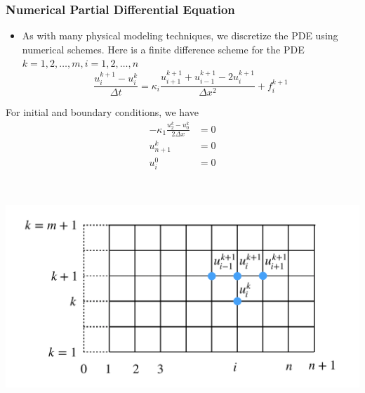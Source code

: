 \documentclass{beamer}
\begin{document}
\begin{frame}
	\frametitle{Numerical Partial Differential Equation}
	
	\begin{itemize}
		\item As with many physical modeling techniques, we discretize the PDE using numerical schemes. Here is a finite difference scheme for the PDE $k=1,2,\ldots,m, i=1,2,\ldots, n$
		$$\frac{u^{k+1}_i-u^k_i}{\Delta t} = \kappa_i \frac{u^{k+1}_{i+1}+u^{k+1}_{i-1}-2u^{k+1}_i}{\Delta x^2} + f_i^{k+1}$$
	\end{itemize}
	\begin{minipage}[c]{0.49\textwidth}
	For initial and boundary conditions, we have
		\begin{align*}
			-\kappa_1 \frac{u_2^{k}-u_0^k}{2\Delta x} &= 0\\
			u_{n+1}^k &= 0 \\
			u_i^0 &= 0
		\end{align*} 
\end{minipage}~
\begin{minipage}[c]{0.49\textwidth}
  \includegraphics[width=1.0\textwidth]{figures/grid}
\end{minipage}
	
		
\end{frame}
\end{document}

